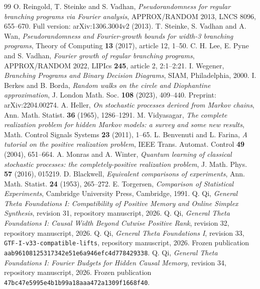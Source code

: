 \begin{thebibliography}{99}
 O. Reingold, T. Steinke and S. Vadhan,
\emph{Pseudorandomness for regular branching programs via Fourier analysis},
APPROX/RANDOM 2013, LNCS 8096, 655--670.
Full version: arXiv:1306.3004v2 (2013).
 T. Steinke, S. Vadhan and A. Wan,
\emph{Pseudorandomness and Fourier-growth bounds for width-3 branching programs},
Theory of Computing \textbf{13} (2017), article 12, 1--50.
 C. H. Lee, E. Pyne and S. Vadhan,
\emph{Fourier growth of regular branching programs},
APPROX/RANDOM 2022, LIPIcs \textbf{245}, article 2, 2:1--2:21.
 I. Wegener, \emph{Branching Programs and Binary Decision
Diagrams}, SIAM, Philadelphia, 2000.
 I. Berkes and B. Borda,
\emph{Random walks on the circle and Diophantine approximation},
J. London Math. Soc. \textbf{108} (2023), 409--440.
Preprint: arXiv:2204.00274.
 A. Heller, \emph{On stochastic processes derived from
Markov chains}, Ann. Math. Statist. \textbf{36} (1965), 1286--1291.
 M. Vidyasagar, \emph{The complete realization problem
for hidden Markov models: a survey and some new results},
Math. Control Signals Systems \textbf{23} (2011), 1--65.
 L. Benvenuti and L. Farina, \emph{A tutorial on the positive
realization problem}, IEEE Trans. Automat. Control \textbf{49} (2004),
651--664.
 A. Monras and A. Winter, \emph{Quantum learning of classical
stochastic processes: the completely-positive realization problem},
J. Math. Phys. \textbf{57} (2016), 015219.
 D. Blackwell, \emph{Equivalent comparisons of experiments},
Ann. Math. Statist. \textbf{24} (1953), 265--272.
 E. Torgersen, \emph{Comparison of Statistical Experiments},
Cambridge University Press, Cambridge, 1991.
 Q. Qi, \emph{General Theta Foundations I: Compatibility
of Positive Memory and Online Simplex Synthesis}, revision 31,
repository manuscript, 2026.
 Q. Qi, \emph{General Theta Foundations I: Causal Width
Beyond Cutwise Positive Rank}, revision 32, repository manuscript, 2026.
 Q. Qi, \emph{General Theta Foundations I}, revision 33,
\texttt{GTF-I-v33-compatible-lifts}, repository manuscript, 2026.
Frozen publication \texttt{aab96108125317342e51e6a946efc4d778429338}.
 Q. Qi, \emph{General Theta Foundations I: Fourier Budgets
for Hidden Causal Memory}, revision 34, repository manuscript, 2026.
Frozen publication \texttt{47bc47e5995e4b1b99a18aaa472a1309f1668f40}.
\end{thebibliography}

